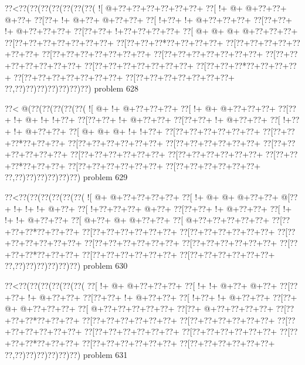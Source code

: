 \vbox{\vbox{\goo
\0??<\0??(\0??(\0??(\0??(\0??(\0??(\0??(
\- ![\- @+\0??+\0??+\0??+\0??+\0??+\0??+
\0??[\- !+\- @+\- @+\0??+\0??+\- @+\0??+
\0??[\0??+\- !+\- @+\0??+\- @+\0??+\0??+
\0??[\- !+\0??+\- !+\- @+\0??+\0??+\0??+
\0??[\0??+\0??+\- !+\- @+\0??+\0??+\0??+
\0??[\0??+\0??+\- !+\0??+\0??+\0??+\0??+
\0??[\- @+\- @+\- @+\- @+\0??+\0??+\0??+
\0??[\0??+\0??+\0??+\0??+\0??+\0??+\0??+
\0??[\0??+\0??+\0??*\0??+\0??+\0??+\0??+
\0??[\0??+\0??+\0??+\0??+\0??+\0??+\0??+
\0??[\0??+\0??+\0??+\0??+\0??+\0??+\0??+
\0??[\0??+\0??+\0??+\0??+\0??+\0??+\0??+
\0??[\0??+\0??+\0??+\0??+\0??+\0??+\0??+
\0??[\0??+\0??+\0??+\0??+\0??+\0??+\0??+
\0??[\0??+\0??+\0??*\0??+\0??+\0??+\0??+
\0??[\0??+\0??+\0??+\0??+\0??+\0??+\0??+
\0??[\0??+\0??+\0??+\0??+\0??+\0??+\0??+
\0??,\0??)\0??)\0??)\0??)\0??)\0??)\0??)
}
\hfil problem 628\hfil\break
}

\vbox{\vbox{\goo
\0??<\- @(\0??(\0??(\0??(\0??(\0??(
\- ![\- @+\- !+\- @+\0??+\0??+\0??+
\0??[\- !+\- @+\- @+\0??+\0??+\0??+
\0??[\0??+\- !+\- @+\- !+\- !+\0??+
\0??[\0??+\0??+\- !+\- @+\0??+\0??+
\0??[\0??+\0??+\- !+\- @+\0??+\0??+
\0??[\- !+\0??+\- !+\- @+\0??+\0??+
\0??[\- @+\- @+\- @+\- !+\- !+\0??+
\0??[\0??+\0??+\0??+\0??+\0??+\0??+
\0??[\0??+\0??+\0??*\0??+\0??+\0??+
\0??[\0??+\0??+\0??+\0??+\0??+\0??+
\0??[\0??+\0??+\0??+\0??+\0??+\0??+
\0??[\0??+\0??+\0??+\0??+\0??+\0??+
\0??[\0??+\0??+\0??+\0??+\0??+\0??+
\0??[\0??+\0??+\0??+\0??+\0??+\0??+
\0??[\0??+\0??+\0??*\0??+\0??+\0??+
\0??[\0??+\0??+\0??+\0??+\0??+\0??+
\0??[\0??+\0??+\0??+\0??+\0??+\0??+
\0??,\0??)\0??)\0??)\0??)\0??)\0??)
}
\hfil problem 629\hfil\break
}

\vbox{\vbox{\goo
\0??<\0??(\0??(\0??(\0??(\0??(\0??(
\- ![\- @+\- @+\0??+\0??+\0??+\0??+
\0??[\- !+\- @+\- @+\- @+\0??+\0??+
\- @[\0??+\- !+\- !+\- !+\- @+\0??+
\0??[\- !+\0??+\0??+\0??+\- @+\0??+
\0??[\0??+\0??+\- !+\- @+\0??+\0??+
\0??[\- !+\- !+\- !+\- @+\0??+\0??+
\0??[\- @+\0??+\- @+\- @+\0??+\0??+
\0??[\- @+\0??+\0??+\0??+\0??+\0??+
\0??[\0??+\0??+\0??*\0??+\0??+\0??+
\0??[\0??+\0??+\0??+\0??+\0??+\0??+
\0??[\0??+\0??+\0??+\0??+\0??+\0??+
\0??[\0??+\0??+\0??+\0??+\0??+\0??+
\0??[\0??+\0??+\0??+\0??+\0??+\0??+
\0??[\0??+\0??+\0??+\0??+\0??+\0??+
\0??[\0??+\0??+\0??*\0??+\0??+\0??+
\0??[\0??+\0??+\0??+\0??+\0??+\0??+
\0??[\0??+\0??+\0??+\0??+\0??+\0??+
\0??,\0??)\0??)\0??)\0??)\0??)\0??)
}
\hfil problem 630\hfil\break
}

\vbox{\vbox{\goo
\0??<\0??(\0??(\0??(\0??(\0??(\0??(
\0??[\- !+\- @+\- @+\0??+\0??+\0??+
\0??[\- !+\- !+\- @+\0??+\- @+\0??+
\0??[\0??+\0??+\- !+\- @+\0??+\0??+
\0??[\0??+\0??+\- !+\- @+\0??+\0??+
\0??[\- !+\0??+\- !+\- @+\0??+\0??+
\0??[\0??+\- @+\- @+\0??+\0??+\0??+
\0??[\- @+\0??+\0??+\0??+\0??+\0??+
\0??[\0??+\- @+\0??+\0??+\0??+\0??+
\0??[\0??+\0??+\0??*\0??+\0??+\0??+
\0??[\0??+\0??+\0??+\0??+\0??+\0??+
\0??[\0??+\0??+\0??+\0??+\0??+\0??+
\0??[\0??+\0??+\0??+\0??+\0??+\0??+
\0??[\0??+\0??+\0??+\0??+\0??+\0??+
\0??[\0??+\0??+\0??+\0??+\0??+\0??+
\0??[\0??+\0??+\0??*\0??+\0??+\0??+
\0??[\0??+\0??+\0??+\0??+\0??+\0??+
\0??[\0??+\0??+\0??+\0??+\0??+\0??+
\0??,\0??)\0??)\0??)\0??)\0??)\0??)
}
\hfil problem 631\hfil\break
}

